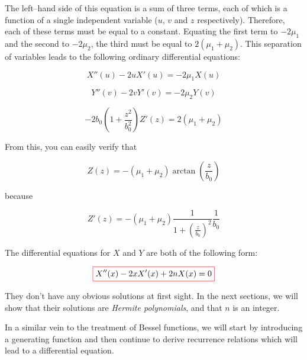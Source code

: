 The left--hand side of this equation is a sum of three terms, each of which is a function of a single independent variable ($u$, $v$ and $z$ respectively). Therefore, each of these terms must be equal to a constant. Equating the first term to $-2\mu_1$ and the second to $-2\mu_2$, the third must be equal to $2(\mu_1+\mu_2)$. This separation of variables leads to the following ordinary differential equations:

\begin{equation}
X''(u) - 2 u X'(u) = - 2 \mu_1 X(u) 
\end{equation} 

\begin{equation}
Y''(v) - 2 v Y'(v) = - 2 \mu_2 Y(v)
\end{equation} 

\begin{equation}
-2b_0\left(1 + \frac{z^2}{b_0^2}\right)Z'(z) = 2(\mu_1+\mu_2)
\end{equation} 

From this, you can easily verify that 

$$Z(z) = -(\mu_1+\mu_2) \arctan\left(\frac{z}{b_0}\right)$$

because

\begin{equation}
Z'(z) = -(\mu_1+\mu_2) \frac{1}{1+\left(\frac{z}{b_0}\right)^2} \frac{1}{b_0}
\end{equation} 

The differential equations for $X$ and $Y$ are both of the following form: 

\begin{equation}
\fbox{$\displaystyle
X''(x) - 2 x X'(x) + 2 n X(x) = 0 \label{eq-diff-hermite-0}
$}
\end{equation} 

They don't have any obvious solutions at first sight. In the next sections, we will show that their solutions are \emph{Hermite polynomials}, and that $n$ is an integer.

In a similar vein to the treatment of Bessel functions, we will start by introducing a generating function and then continue to derive recurrence relations which will lead to a differential equation.

\pagebreak


